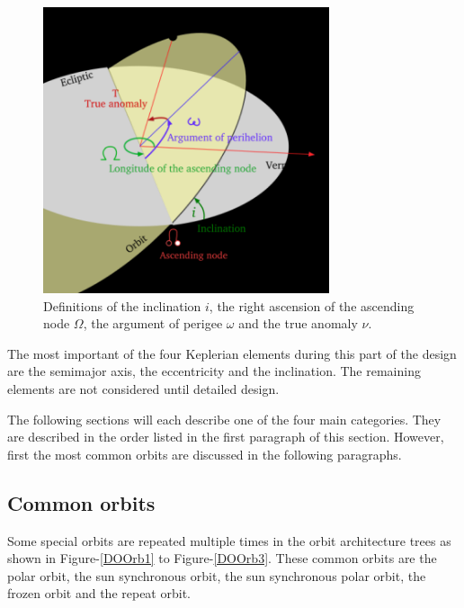 \begin{figure} [h]
	\begin{center}
         \includegraphics[width=0.75\textwidth,angle=0]{chapters/img/OrbElements.png}
	\caption{Definitions of the inclination $i$, the right ascension of the ascending node $\Omega$, the argument of perigee $\omega$ and the true anomaly $\nu$.}
	\label{OrbElements}
	\end{center}
	\end{figure}
The most important of the four Keplerian elements during this part of the design are the semimajor axis, the eccentricity and the inclination. The remaining elements are not considered until detailed design.

The following sections will each describe one of the four main categories. They are described in the order listed in the first paragraph of this section. However, first the most common orbits are discussed in the following paragraphs.

\subsection {Common orbits}
\label{sec:blOrbCommon}
Some special orbits are repeated multiple times in the orbit architecture trees as shown in Figure-\ref{DOOrb1} to Figure-\ref{DOOrb3}. These common orbits are the polar orbit, the sun synchronous orbit, the sun synchronous polar orbit, the frozen orbit and the repeat orbit.

